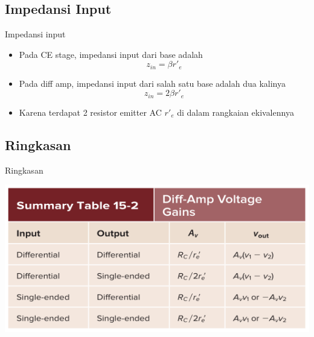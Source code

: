 \documentclass[aspectratio=169]{beamer}
\begin{document}
\subsection{Impedansi Input}
\begin{frame}{Impedansi input}
	\begin{itemize}
		\item Pada CE stage, impedansi input dari base adalah
		\[ z_{in} = \beta r'_e \]
		\item Pada diff amp, impedansi input dari salah satu base adalah dua kalinya
		\begin{equation}
			z_{in} = 2 \beta r'_e
		\end{equation}
		\item Karena terdapat 2 resistor emitter AC $ r'_e $ di dalam rangkaian ekivalennya
	\end{itemize}
\end{frame}

\subsection{Ringkasan}
\begin{frame}{Ringkasan}
	\begin{center}
		\includegraphics[height=0.7\textheight]{gambar/01.summary-diff-amp_voltage_gains}
	\end{center}
\end{frame}
\end{document}

